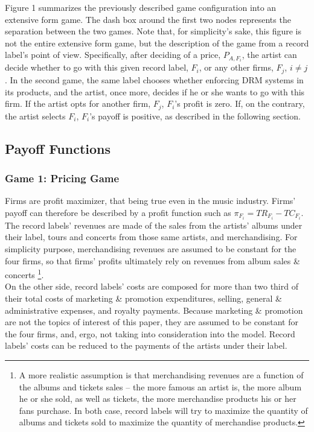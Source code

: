 \documentclass[a4paper,12pt]{article}
\numberwithin{equation}{section}
\begin{document}
Figure 1 summarizes the previously described game configuration into an extensive form game. The dash box around the first two nodes represents the separation between the two games. Note that, for simplicity's sake, this figure is not the entire extensive form game, but the description of the game from a record label's point of view. Specifically, after deciding of a price, $P_{A, F_i}$, the artist can decide whether to go with this given record label, $F_i$, or any other firms, $F_j$, $i \ne j$. In the second game, the same label chooses whether enforcing DRM systems in its products, and the artist, once more, decides if he or she wants to go with this firm. If the artist opts for another firm, $F_j$, $F_i$'s profit is zero. If, on the contrary, the artist selects $F_i$, $F_i$'s payoff is positive, as described in the following section.

\subsection{Payoff Functions}

\subsubsection{Game 1: Pricing Game}

Firms are profit maximizer, that being true even in the music industry. Firms' payoff can therefore be described by a profit function such as $\pi_{F_i} = TR_{F_i} - TC_{F_i}$.\\

The record labels' revenues are made of the sales from the artists' albums under their label, tours and concerts from those same artists, and merchandising. For simplicity purpose, merchandising revenues are assumed to be constant for the four firms, so that firms' profits ultimately rely on revenues from album sales \& concerts \footnote{
A more realistic assumption is that merchandising revenues are a function of the albums and tickets sales – the more famous an artist is, the more album he or she sold, as well as tickets, the more merchandise products his or her fans purchase. In both case, record labels will try to maximize the quantity of albums and tickets sold to maximize the quantity of merchandise products.
}.\\

On the other side, record labels' costs are composed for more than two third of their total costs of marketing \& promotion expenditures, selling, general \& administrative expenses, and royalty payments. Because marketing \& promotion are not the topics of interest of this paper, they are assumed to be constant for the four firms, and, ergo, not taking into consideration into the model. Record labels' costs can be reduced to the payments of the artists under their label.\\
\end{document}
